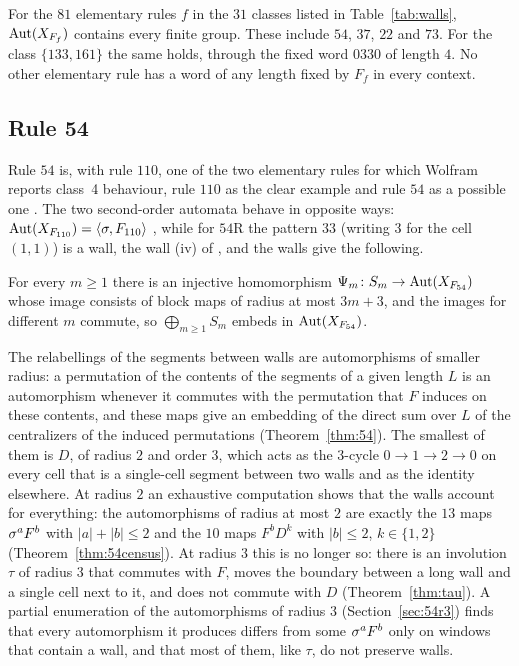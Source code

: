 \begin{corollary}\label{cor:48}
For the $81$ elementary rules $f$ in the $31$ classes listed in Table~\ref{tab:walls}, $\operatorname{Aut}(X_{F_f})$ contains every finite group. These include $54$, $37$, $22$ and $73$. For the class $\{133,161\}$ the same holds, through the fixed word $0330$ of length $4$. No other elementary rule has a word of any length fixed by $F_f$ in every context.
\end{corollary}

\subsection*{Rule 54}
Rule $54$ is, with rule $110$, one of the two elementary rules for which Wolfram reports class~4 behaviour, rule $110$ as the clear example and rule $54$ as a possible one \cite[pp.~693--697]{Wolfram2002}. The two second-order automata behave in opposite ways: $\operatorname{Aut}(X_{F_{110}})=\langle\sigma,F_{110}\rangle$ \cite{PaperA}, while for $54$R the pattern $33$ (writing $3$ for the cell $(1,1)$) is a wall, the wall (iv) of \cite[Table~III]{Takesue1989}, and the walls give the following.

\begin{theorem}\label{thm:finite}
For every $m\ge1$ there is an injective homomorphism $\Psi_m\colon S_m\to\operatorname{Aut}(X_{F_{54}})$ whose image consists of block maps of radius at most $3m+3$, and the images for different $m$ commute, so $\bigoplus_{m\ge1}S_m$ embeds in $\operatorname{Aut}(X_{F_{54}})$.
\end{theorem}

The relabellings of the segments between walls are automorphisms of smaller radius: a permutation of the contents of the segments of a given length $L$ is an automorphism whenever it commutes with the permutation that $F$ induces on these contents, and these maps give an embedding of the direct sum over $L$ of the centralizers of the induced permutations (Theorem~\ref{thm:54}). The smallest of them is $D$, of radius $2$ and order $3$, which acts as the $3$-cycle $0\to1\to2\to0$ on every cell that is a single-cell segment between two walls and as the identity elsewhere. At radius $2$ an exhaustive computation shows that the walls account for everything: the automorphisms of radius at most $2$ are exactly the $13$ maps $\sigma^aF^b$ with $|a|+|b|\le2$ and the $10$ maps $F^bD^k$ with $|b|\le 2$, $k\in\{1,2\}$ (Theorem~\ref{thm:54census}). At radius $3$ this is no longer so: there is an involution $\tau$ of radius $3$ that commutes with $F$, moves the boundary between a long wall and a single cell next to it, and does not commute with $D$ (Theorem~\ref{thm:tau}). A partial enumeration of the automorphisms of radius $3$ (Section~\ref{sec:54r3}) finds that every automorphism it produces differs from some $\sigma^aF^b$ only on windows that contain a wall, and that most of them, like $\tau$, do not preserve walls.

